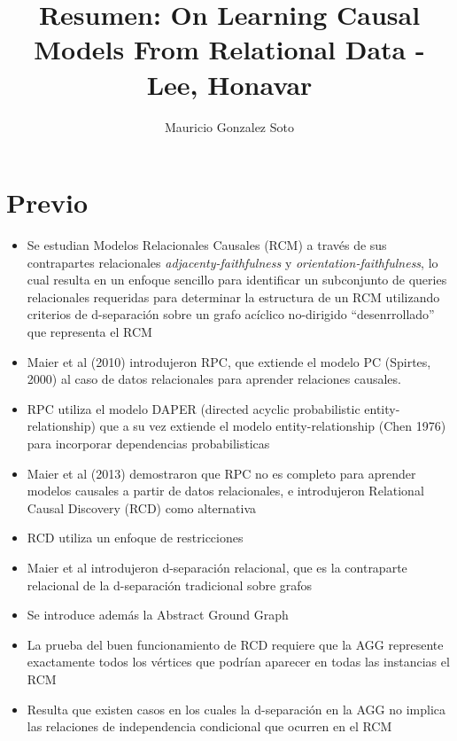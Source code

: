 \documentclass[11pt]{article}
\title{Resumen: On Learning Causal Models From Relational Data - Lee, Honavar}
\author{Mauricio Gonzalez Soto}
\theoremstyle{plain}
\begin{document}
\maketitle
\section{Previo}
\begin{itemize}
\item Se estudian Modelos Relacionales Causales (RCM) a través de sus contrapartes relacionales \textit{adjacenty-faithfulness} y \textit{orientation-faithfulness}, lo cual resulta en un enfoque sencillo para identificar un subconjunto de queries relacionales requeridas para determinar la estructura de un RCM utilizando criterios de d-separación sobre un grafo acíclico no-dirigido “desenrrollado” que representa el RCM
\item Maier et al (2010) introdujeron RPC, que extiende el modelo PC (Spirtes, 2000) al caso de datos relacionales para aprender relaciones causales. 
\item RPC utiliza el modelo DAPER (directed acyclic probabilistic entity-relationship) que a su vez extiende el modelo entity-relationship (Chen 1976) para incorporar dependencias probabilisticas
\item Maier et al (2013) demostraron que RPC no es completo para aprender modelos causales a partir de datos relacionales, e introdujeron Relational Causal Discovery (RCD) como alternativa
\item RCD utiliza un enfoque de restricciones
\item Maier et al introdujeron d-separación relacional, que es la contraparte relacional de la d-separación tradicional sobre grafos
\item Se introduce además la Abstract Ground Graph
\item La prueba del buen funcionamiento de RCD requiere que la AGG represente exactamente todos los vértices que podrían aparecer en todas las instancias el RCM
\item Resulta que existen casos en los cuales la d-separación en la AGG no implica las relaciones de independencia condicional que ocurren en el RCM
\end{itemize}
\end{document}
